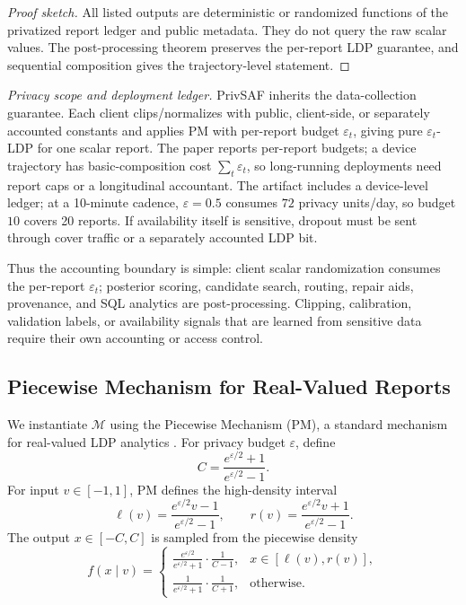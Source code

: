 \documentclass[conference]{IEEEtran}
\begin{document}
\begin{proof}[Proof sketch]
All listed outputs are deterministic or randomized functions of the privatized report ledger and public metadata. They do not query the raw scalar values. The post-processing theorem preserves the per-report LDP guarantee, and sequential composition gives the trajectory-level statement.
\end{proof}

\noindent\emph{Privacy scope and deployment ledger.}
PrivSAF inherits the data-collection guarantee. Each client clips/normalizes with public, client-side, or separately accounted constants and applies PM with per-report budget \(\varepsilon_t\), giving pure \(\varepsilon_t\)-LDP for one scalar report. The paper reports per-report budgets; a device trajectory has basic-composition cost \(\sum_t\varepsilon_t\), so long-running deployments need report caps or a longitudinal accountant. The artifact includes a device-level ledger; at a 10-minute cadence, \(\varepsilon=0.5\) consumes \(72\) privacy units/day, so budget \(10\) covers 20 reports. If availability itself is sensitive, dropout must be sent through cover traffic or a separately accounted LDP bit.

Thus the accounting boundary is simple: client scalar randomization consumes the per-report \(\varepsilon_t\); posterior scoring, candidate search, routing, repair aids, provenance, and SQL analytics are post-processing. Clipping, calibration, validation labels, or availability signals that are learned from sensitive data require their own accounting or access control.

\subsection{Piecewise Mechanism for Real-Valued Reports}
\label{sec:pm}

We instantiate \(\mathcal{M}\) using the Piecewise Mechanism (PM), a standard mechanism for real-valued LDP analytics \cite{wang2019multidimensional}. For privacy budget \(\varepsilon\), define
\[
C =
\frac{e^{\varepsilon/2}+1}{e^{\varepsilon/2}-1}.
\]
For input \(v\in[-1,1]\), PM defines the high-density interval
\[
\ell(v)=\frac{e^{\varepsilon/2}v-1}{e^{\varepsilon/2}-1},
\qquad
r(v)=\frac{e^{\varepsilon/2}v+1}{e^{\varepsilon/2}-1}.
\]
The output \(x\in[-C,C]\) is sampled from the piecewise density
\begin{equation}
f(x\mid v)=
\begin{cases}
\frac{e^{\varepsilon/2}}{e^{\varepsilon/2}+1}\cdot \frac{1}{C-1},
& x\in[\ell(v),r(v)],\\[4pt]
\frac{1}{e^{\varepsilon/2}+1}\cdot \frac{1}{C+1},
& \text{otherwise}.
\end{cases}
\label{eq:pm-pdf}
\end{equation}
\end{document}

